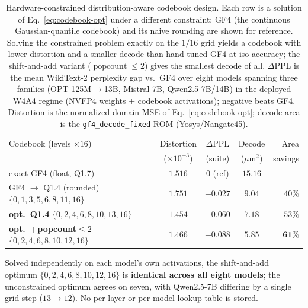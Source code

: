 \begin{table}[t]
  \centering
  \caption{Hardware-constrained distribution-aware codebook design. Each row is a
  solution of Eq.~\eqref{eq:codebook-opt} under a different constraint; GF4 (the
  continuous Gaussian-quantile codebook) and its naive rounding are shown for
  reference. Solving the constrained problem exactly on the $1/16$ grid yields a
  codebook with lower distortion and a smaller decode than hand-tuned GF4 at
  iso-accuracy; the shift-and-add variant ($\operatorname{popcount}\le2$) gives
  the smallest decode of all. $\Delta$PPL is the mean WikiText-2 perplexity gap
  vs.\ GF4 over eight models spanning three families (OPT-125M$\to$13B,
  Mistral-7B, Qwen2.5-7B/14B) in the deployed W4A4 regime (NVFP4 weights $+$
  codebook activations); negative beats GF4. Distortion is the normalized-domain
  MSE of Eq.~\eqref{eq:codebook-opt}; decode area is the \texttt{gf4\_decode\_fixed}
  ROM (Yosys/Nangate45).}
  \label{tab:codebook-design}
  \small
  \begin{tabular}{lcccr}
    \toprule
    Codebook (levels $\times 16$) & Distortion & $\overline{\Delta\text{PPL}}$ & Decode & Area \\
                                  & ($\times10^{-3}$) & (suite) & ($\mu$m$^2$) & savings \\
    \midrule
    exact GF4 (float, Q1.7)                       & $1.516$ & $0$ (ref) & $15.16$ & --- \\
    GF4 $\rightarrow$ Q1.4 (rounded) $\{0,1,3,5,6,8,11,16\}$ & $1.751$ & $+0.027$ & $9.04$ & $40\%$ \\
    \midrule
    \textbf{opt.\ Q1.4} $\{0,2,4,6,8,10,13,16\}$  & $\mathbf{1.454}$ & $-0.060$ & $7.18$ & $53\%$ \\
    \textbf{opt.\ +popcount$\le 2$} $\{0,2,4,6,8,10,12,16\}$ & $1.466$ & $\mathbf{-0.088}$ & $\mathbf{5.85}$ & $\mathbf{61\%}$ \\
    \bottomrule
  \end{tabular}

  \vspace{0.6ex}
  {\footnotesize Solved independently on each model's own activations, the
  shift-and-add optimum $\{0,2,4,6,8,10,12,16\}$ is \textbf{identical across all
  eight models}; the unconstrained optimum agrees on seven, with Qwen2.5-7B
  differing by a single grid step ($13\!\to\!12$). No per-layer or per-model
  lookup table is stored.}
\end{table}
